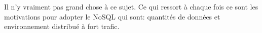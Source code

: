 
\\
\\
Il n'y vraiment pas grand chose à ce sujet. Ce qui ressort à chaque fois ce sont les motivations pour adopter le \textsf{NoSQL} qui sont: quantités de données et environnement distribué à fort trafic.
